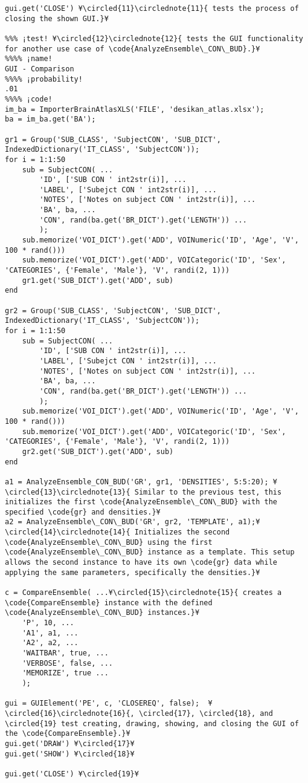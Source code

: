 \documentclass{tufte-handout}
\begin{document}
\begin{lstlisting}
gui.get('CLOSE') ¥\circled{11}\circlednote{11}{ tests the process of closing the shown GUI.}¥

%%% ¡test! ¥\circled{12}\circlednote{12}{ tests the GUI functionality for another use case of \code{AnalyzeEnsemble\_CON\_BUD}.}¥
%%%% ¡name!
GUI - Comparison
%%%% ¡probability!
.01
%%%% ¡code!
im_ba = ImporterBrainAtlasXLS('FILE', 'desikan_atlas.xlsx');
ba = im_ba.get('BA');

gr1 = Group('SUB_CLASS', 'SubjectCON', 'SUB_DICT', IndexedDictionary('IT_CLASS', 'SubjectCON'));
for i = 1:1:50
    sub = SubjectCON( ...
        'ID', ['SUB CON ' int2str(i)], ...
        'LABEL', ['Subejct CON ' int2str(i)], ...
        'NOTES', ['Notes on subject CON ' int2str(i)], ...
        'BA', ba, ...
        'CON', rand(ba.get('BR_DICT').get('LENGTH')) ...
        );
    sub.memorize('VOI_DICT').get('ADD', VOINumeric('ID', 'Age', 'V', 100 * rand()))
    sub.memorize('VOI_DICT').get('ADD', VOICategoric('ID', 'Sex', 'CATEGORIES', {'Female', 'Male'}, 'V', randi(2, 1)))
    gr1.get('SUB_DICT').get('ADD', sub)
end

gr2 = Group('SUB_CLASS', 'SubjectCON', 'SUB_DICT', IndexedDictionary('IT_CLASS', 'SubjectCON'));
for i = 1:1:50
    sub = SubjectCON( ...
        'ID', ['SUB CON ' int2str(i)], ...
        'LABEL', ['Subejct CON ' int2str(i)], ...
        'NOTES', ['Notes on subject CON ' int2str(i)], ...
        'BA', ba, ...
        'CON', rand(ba.get('BR_DICT').get('LENGTH')) ...
        );
    sub.memorize('VOI_DICT').get('ADD', VOINumeric('ID', 'Age', 'V', 100 * rand()))
    sub.memorize('VOI_DICT').get('ADD', VOICategoric('ID', 'Sex', 'CATEGORIES', {'Female', 'Male'}, 'V', randi(2, 1)))
    gr2.get('SUB_DICT').get('ADD', sub)
end

a1 = AnalyzeEnsemble_CON_BUD('GR', gr1, 'DENSITIES', 5:5:20); ¥\circled{13}\circlednote{13}{ Similar to the previous test, this initializes the first \code{AnalyzeEnsemble\_CON\_BUD} with the specified \code{gr} and densities.}¥
a2 = AnalyzeEnsemble\_CON\_BUD('GR', gr2, 'TEMPLATE', a1);¥\circled{14}\circlednote{14}{ Initializes the second \code{AnalyzeEnsemble\_CON\_BUD} using the first \code{AnalyzeEnsemble\_CON\_BUD} instance as a template. This setup allows the second instance to have its own \code{gr} data while applying the same parameters, specifically the densities.}¥

c = CompareEnsemble( ...¥\circled{15}\circlednote{15}{ creates a \code{CompareEnsemble} instance with the defined \code{AnalyzeEnsemble\_CON\_BUD} instances.}¥
    'P', 10, ...
    'A1', a1, ...
    'A2', a2, ...
    'WAITBAR', true, ...
    'VERBOSE', false, ...
    'MEMORIZE', true ...
    );

gui = GUIElement('PE', c, 'CLOSEREQ', false);  ¥\circled{16}\circlednote{16}{, \circled{17}, \circled{18}, and \circled{19} test creating, drawing, showing, and closing the GUI of the \code{CompareEnsemble}.}¥
gui.get('DRAW') ¥\circled{17}¥
gui.get('SHOW') ¥\circled{18}¥

gui.get('CLOSE') ¥\circled{19}¥

\end{lstlisting}
\end{document}
